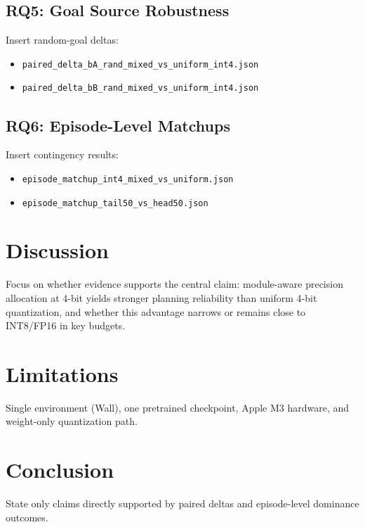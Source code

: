 \documentclass{article}
\begin{document}
\subsection{RQ5: Goal Source Robustness}
Insert random-goal deltas:
\begin{itemize}
  \item \texttt{paired\_delta\_bA\_rand\_mixed\_vs\_uniform\_int4.json}
  \item \texttt{paired\_delta\_bB\_rand\_mixed\_vs\_uniform\_int4.json}
\end{itemize}

\subsection{RQ6: Episode-Level Matchups}
Insert contingency results:
\begin{itemize}
  \item \texttt{episode\_matchup\_int4\_mixed\_vs\_uniform.json}
  \item \texttt{episode\_matchup\_tail50\_vs\_head50.json}
\end{itemize}

\section{Discussion}
Focus on whether evidence supports the central claim:
module-aware precision allocation at 4-bit yields stronger planning reliability than uniform 4-bit quantization, and whether this advantage narrows or remains close to INT8/FP16 in key budgets.

\section{Limitations}
Single environment (Wall), one pretrained checkpoint, Apple M3 hardware, and weight-only quantization path.

\section{Conclusion}
State only claims directly supported by paired deltas and episode-level dominance outcomes.



\end{document}
